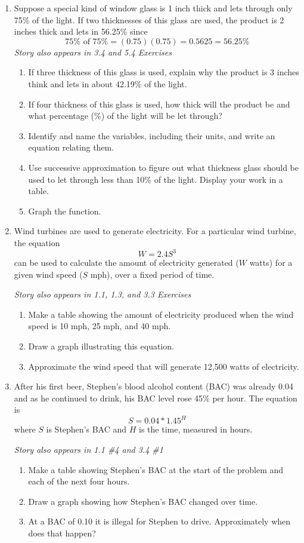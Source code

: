 \begin{enumerate}
\item Suppose a special kind of window glass is 1 inch thick and lets through only 75\% of the light. If two thicknesses of this glass are used, the product is 2 inches thick and lets in 56.25\% since $$75\% \text{ of } 75\% = (0.75)(0.75) = 0.5625 = 56.25\%$$ 
 \hfill \emph{Story also appears in 3.4 and 5.4 Exercises}
\begin{enumerate}
\item If three thickness of this glass is used, explain why the product is 3 inches think and lets in about 42.19\% of the light.
\item If four thickness of this glass is used, how thick will the product be and what percentage (\%) of the light will be let through?
\item Identify and name the variables, including their units, and write an equation relating them.
\item Use successive approximation to figure out what thickness glass should be used to let through less than 10\% of the light. Display your work in a table.
\item Graph the function.
\end{enumerate} 

\item Wind turbines are used to generate electricity.  For a particular wind turbine, the equation $$W = 2.4 S^3$$ can be used to calculate the amount of electricity generated ($W$ watts) for a given wind speed ($S$ mph), over a fixed period of time.

\hfill \emph{Story also appears in 1.1, 1.3, and 3.3 Exercises}
\begin{enumerate}
\item Make a table showing the amount of electricity produced when the wind speed is 10 mph, 25 mph, and 40 mph. 
\item Draw a graph illustrating this equation.
\item Approximate the wind speed that will generate 12,500 watts of electricity. 
\end{enumerate} 

\item After his first beer, Stephen's blood alcohol content (BAC) was already 0.04 and as he continued to drink, his BAC level rose 45\% per hour.  The equation is $$S = 0.04 \ast 1.45^H$$ where $S$ is Stephen's BAC and $H$ is the time, measured in hours.

\hfill \emph{Story also appears in 1.1 \#4 and 3.4 \#1} 
\begin{enumerate}
\item Make a table showing Stephen's BAC at the start of the problem and each of the next four hours.
\item Draw a graph showing how Stephen's BAC changed over time.
\item At a BAC of 0.10 it is illegal for Stephen to drive.  Approximately when does that happen?
\end{enumerate}  


\end{enumerate}
